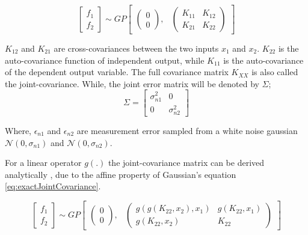    \begin{equation}\label{eq:mogpJointPrior}
   \begin{bmatrix}
   f_{1}\\
   f_{2}
   
   \end{bmatrix} \sim GP\begin{bmatrix}
   \begin{pmatrix}
   0\\ 
   0
   \end{pmatrix} ,& 
   \begin{pmatrix}
   K_{11}  & K_{12}\\ K_{21}
    & K_{22}
   \end{pmatrix}
   \end{bmatrix}
   \end{equation}
   
   
   \(K_{12}\) and \(K_{21}\) are cross-covariances between the two inputs \(x_{1}\) and \(x_{2}\). \(K_{22}\) is the auto-covariance function of independent output, while \(K_{11}\) is the auto-covariance of the dependent output variable. The full covariance matrix \(K_{XX}\) is also called the joint-covariance. While, the joint error matrix will be denoted by \(\Sigma\);
         \begin{equation}\label{eq:sigmaToError}
         \Sigma = 
          \begin{bmatrix}
          \sigma _{n1}^{2} & 0 \\ 
          0 & \sigma _{n2}^{2}
          \end{bmatrix} 
         \end{equation}
         
      Where, \(\epsilon_{n1}\) and \(\epsilon_{n2}\) are measurement error sampled from a white noise gaussian \(\mathcal{N}(0, \sigma_{n1})\) and \(\mathcal{N}(0, \sigma_{n2})\). 
      
    For a linear operator \(g(.)\) the joint-covariance matrix can be derived analytically \cite{Stein1999Springer}, due to the affine property of Gaussian's equation \ref{eq:exactJointCovariance}. 
   
    \begin{equation}\label{eq:exactJointCovariance}
    \begin{bmatrix}
    f_{1}\\
    f_{2}
      
    \end{bmatrix} \sim GP\begin{bmatrix}
    \begin{pmatrix}
    0\\ 
    0
    \end{pmatrix} ,& 
    \begin{pmatrix}
    g(g(K_{22}, x_{2}), x_{1}) & g(K_{22}, x_{1})\\ g(K_{22}, x_{2}) & K_{22}
    \end{pmatrix} 
    \end{bmatrix}
    \end{equation}
      
